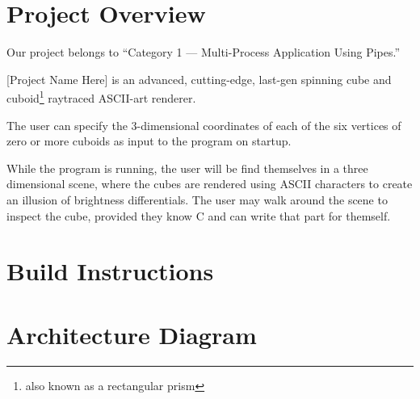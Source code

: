 \documentclass{article}
\begin{document}
\section{Project Overview}


Our project belongs to ``Category 1 --- Multi-Process Application Using Pipes.''

[Project Name Here] is an advanced, cutting-edge, last-gen spinning cube and cuboid\footnote{also known as a rectangular prism} raytraced ASCII-art renderer.

The user can specify the 3-dimensional coordinates of each of the six vertices of zero or more cuboids as input to the program on startup.

While the program is running, the user will be find themselves in a three dimensional scene, where the cubes are rendered using ASCII characters to create an illusion of brightness differentials.
The user may walk around the scene to inspect the cube, provided they know C and can write that part for themself.

\section{Build Instructions}


\section{Architecture Diagram}

\end{document}
